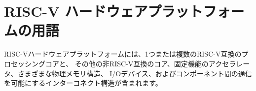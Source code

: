 \begin{comment}
\section{RISC-V Hardware Platform Terminology}

A RISC-V hardware platform can contain one or more RISC-V-compatible
processing cores together with other non-RISC-V-compatible cores,
fixed-function accelerators, various physical memory structures, I/O
devices, and an interconnect structure to allow the components to
communicate.

A component is termed a {\em core} if it contains an independent
instruction fetch unit.  A RISC-V-compatible core might support
multiple RISC-V-compatible hardware threads, or {\em harts}, through
multithreading.

A RISC-V core might have additional specialized instruction-set
extensions or an added {\em coprocessor}.  We use the term {\em
  coprocessor} to refer to a unit that is attached to a RISC-V core
and is mostly sequenced by a RISC-V instruction stream, but which
contains additional architectural state and instruction-set
extensions, and possibly some limited autonomy relative to the
primary RISC-V instruction stream.

We use the term {\em accelerator} to refer to either a
non-programmable fixed-function unit or a core that can operate
autonomously but is specialized for certain tasks.  In RISC-V systems,
we expect many programmable accelerators will be RISC-V-based cores
with specialized instruction-set extensions and/or customized
coprocessors.  An important class of RISC-V accelerators are I/O
accelerators, which offload I/O processing tasks from the main
application cores.

The system-level organization of a RISC-V hardware platform can range
from a single-core microcontroller to a many-thousand-node cluster of
shared-memory manycore server nodes.  Even small systems-on-a-chip
might be structured as a hierarchy of multicomputers and/or
multiprocessors to modularize development effort or to provide secure
isolation between subsystems.
\end{comment}

\section{RISC-V ハードウェアプラットフォームの用語}

RISC-Vハードウェアプラットフォームには、1つまたは複数のRISC-V互換のプロセッシングコアと、
その他の非RISC-V互換のコア、固定機能のアクセラレータ、さまざまな物理メモリ構造、
I/Oデバイス、およびコンポーネント間の通信を可能にするインターコネクト構造が含まれます。

